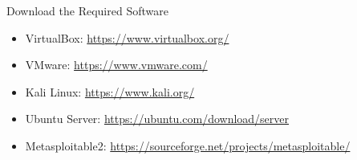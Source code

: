 \begin{frame}{Download the Required Software}
  \begin{itemize}
    \item VirtualBox: \url{https://www.virtualbox.org/}
    \item VMware: \url{https://www.vmware.com/}
    \item Kali Linux: \url{https://www.kali.org/}
    \item Ubuntu Server: \url{https://ubuntu.com/download/server}
    \item Metasploitable2: \url{https://sourceforge.net/projects/metasploitable/}
  \end{itemize}
\end{frame}
